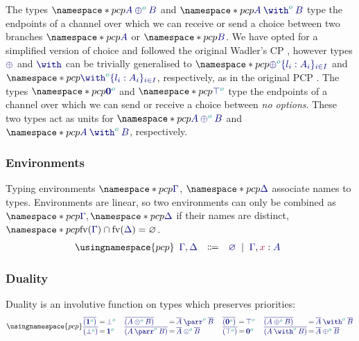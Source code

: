 \documentclass[main.tex]{subfiles}
\begin{document}
The types $\pcp{\ty{\typlus[\cs{o}]{A}{B}}}$ and $\pcp{\ty{\tywith[\cs{o}]{A}{B}}}$ type the endpoints of a channel over which we can receive or send a choice between two branches $\pcp{\ty{A}}$ or $\pcp{\ty{B}}$. We have opted for a simplified version of choice and followed the original Wadler's CP \cite{wadler12}, however types $\ty{\oplus}$ and $\ty{\with}$ can be trivially generalised to $\pcp{\ty{\oplus^{\cs{o}}\{l_i:A_i\}_{i\in I}}}$ and $\pcp{\ty{\with^{\cs{o}}\{l_i:A_i\}_{i\in I}}}$, respectively, as in the original PCP \cite{dardhagay18}.
The types $\pcp{\ty{\tynil[\cs{o}]}}$ and $\pcp{\ty{\tytop[\cs{o}]}}$ type the endpoints of a channel over which we can send or receive a choice between \emph{no options}. These two types act as units for $\pcp{\ty{\typlus[\cs{o}]{A}{B}}}$ and $\pcp{\ty{\tywith[\cs{o}]{A}{B}}}$, respectively.

\subsubsection*{Environments}
Typing environments $\pcp{\ty{\Gamma}}$, $\pcp{\ty{\Delta}}$ associate names to types. Environments are linear, so two environments can only be combined as $\pcp{\ty{\Gamma}}, \pcp{\ty{\Delta}}$ if their names are distinct, \ie $\pcp{\fv(\ty{\Gamma})\cap\fv(\ty{\Delta})=\varnothing}$.
\[
  \usingnamespace{pcp}
  \begin{array}{lcl}
    \ty{\Gamma}, \ty{\Delta}
    & \Coloneqq & \ty{\emptyenv}
      \sep        \ty{\Gamma}, \tmty{x}{A}
  \end{array}
\]

\subsubsection*{Duality}
Duality is an involutive function on types which preserves priorities:
\[
  \usingnamespace{pcp}
  \setlength{\arraycolsep}{1pt}
  \begin{array}{lcl}
    \ty{\co{(\tyone[\cs{o}])}} & = & \ty{\tybot[\cs{o}]} \\
    \ty{\co{(\tybot[\cs{o}])}} & = & \ty{\tyone[\cs{o}]}
  \end{array}
  \quad
  \begin{array}{lcl}
    \ty{\co{(\tytens[\cs{o}]{A}{B})}} & = & \ty{\typarr[\cs{o}]{\co{A}}{\co{B}}} \\
    \ty{\co{(\typarr[\cs{o}]{A}{B})}} & = & \ty{\tytens[\cs{o}]{\co{A}}{\co{B}}}
  \end{array}
  \quad
  \begin{array}{lcl}
    \ty{\co{(\tynil[\cs{o}])}} & = & \ty{\tytop[\cs{o}]} \\
    \ty{\co{(\tytop[\cs{o}])}} & = & \ty{\tynil[\cs{o}]}
  \end{array}
  \quad
  \begin{array}{lcl}
    \ty{\co{(\typlus[\cs{o}]{A}{B})}} & = & \ty{\tywith[\cs{o}]{\co{A}}{\co{B}}} \\
    \ty{\co{(\tywith[\cs{o}]{A}{B})}} & = & \ty{\typlus[\cs{o}]{\co{A}}{\co{B}}}
  \end{array}
\]
\end{document}
